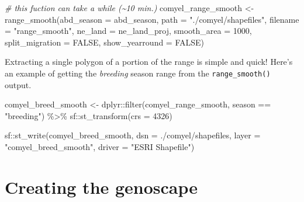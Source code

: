 \documentclass[
]{book}
\newenvironment{Shaded}{\begin{snugshade}}{\end{snugshade}}
\newcommand{\AttributeTok}[1]{\textcolor[rgb]{0.77,0.63,0.00}{#1}}
\newcommand{\CommentTok}[1]{\textcolor[rgb]{0.56,0.35,0.01}{\textit{#1}}}
\newcommand{\ConstantTok}[1]{\textcolor[rgb]{0.00,0.00,0.00}{#1}}
\newcommand{\DecValTok}[1]{\textcolor[rgb]{0.00,0.00,0.81}{#1}}
\newcommand{\FunctionTok}[1]{\textcolor[rgb]{0.00,0.00,0.00}{#1}}
\newcommand{\NormalTok}[1]{#1}
\newcommand{\OtherTok}[1]{\textcolor[rgb]{0.56,0.35,0.01}{#1}}
\newcommand{\SpecialCharTok}[1]{\textcolor[rgb]{0.00,0.00,0.00}{#1}}
\newcommand{\StringTok}[1]{\textcolor[rgb]{0.31,0.60,0.02}{#1}}
\begin{document}
\begin{Shaded}
\begin{Highlighting}[]
\CommentTok{\# this fuction can take a while (\textasciitilde{}10 min.)}
\NormalTok{comyel\_range\_smooth }\OtherTok{\textless{}{-}} \FunctionTok{range\_smooth}\NormalTok{(}\AttributeTok{abd\_season =}\NormalTok{ abd\_season, }
                                  \AttributeTok{path =} \StringTok{"./comyel/shapefiles"}\NormalTok{, }
                                  \AttributeTok{filename =} \StringTok{"range\_smooth"}\NormalTok{,}
                                  \AttributeTok{ne\_land =}\NormalTok{ ne\_land\_proj,}
                                  \AttributeTok{smooth\_area =} \DecValTok{1000}\NormalTok{,}
                                  \AttributeTok{split\_migration =} \ConstantTok{FALSE}\NormalTok{, }
                                  \AttributeTok{show\_yearround =} \ConstantTok{FALSE}\NormalTok{)}
\end{Highlighting}
\end{Shaded}

Extracting a single polygon of a portion of the range is simple and quick! Here's an example of getting the \emph{breeding} season range from the \texttt{range\_smooth()} output.

\begin{Shaded}
\begin{Highlighting}[]
\NormalTok{comyel\_breed\_smooth }\OtherTok{\textless{}{-}}\NormalTok{ dplyr}\SpecialCharTok{::}\FunctionTok{filter}\NormalTok{(comyel\_range\_smooth,}
\NormalTok{                                season }\SpecialCharTok{==} \StringTok{"breeding"}\NormalTok{) }\SpecialCharTok{\%\textgreater{}\%}
\NormalTok{                    sf}\SpecialCharTok{::}\FunctionTok{st\_transform}\NormalTok{(}\AttributeTok{crs =} \DecValTok{4326}\NormalTok{)}

\NormalTok{sf}\SpecialCharTok{::}\FunctionTok{st\_write}\NormalTok{(comyel\_breed\_smooth, }\AttributeTok{dsn =} \StringTok{\textquotesingle{}./comyel/shapefiles\textquotesingle{}}\NormalTok{,}
          \AttributeTok{layer =} \StringTok{"comyel\_breed\_smooth"}\NormalTok{,}
          \AttributeTok{driver =} \StringTok{"ESRI Shapefile"}\NormalTok{)}
\end{Highlighting}
\end{Shaded}

\hypertarget{creating-the-genoscape}{%
\section{Creating the genoscape}\label{creating-the-genoscape}}
\end{document}
